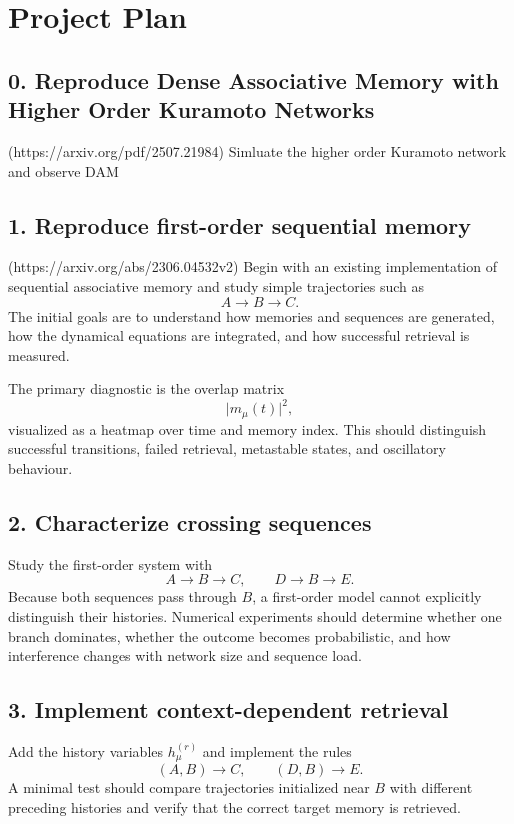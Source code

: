 \documentclass[11pt]{article}
\begin{document}
\section{Project Plan}
\subsection*{0. Reproduce Dense Associative Memory with Higher Order Kuramoto Networks}
(https://arxiv.org/pdf/2507.21984)
Simluate the higher order Kuramoto network and observe DAM


\subsection*{1. Reproduce first-order sequential memory}
(https://arxiv.org/abs/2306.04532v2) 
Begin with an existing implementation of sequential associative memory and study simple trajectories such as
\[
A\to B\to C.
\]
The initial goals are to understand how memories and sequences are generated, how the dynamical equations are integrated, and how successful retrieval is measured.

The primary diagnostic is the overlap matrix
\[
\lvert m_\mu(t)\rvert^2,
\]
visualized as a heatmap over time and memory index. This should distinguish successful transitions, failed retrieval, metastable states, and oscillatory behaviour.

\subsection*{2. Characterize crossing sequences}

Study the first-order system with
\[
A\to B\to C,
\qquad
D\to B\to E.
\]
Because both sequences pass through \(B\), a first-order model cannot explicitly distinguish their histories. Numerical experiments should determine whether one branch dominates, whether the outcome becomes probabilistic, and how interference changes with network size and sequence load.

\subsection*{3. Implement context-dependent retrieval}

Add the history variables \(h_\mu^{(r)}\) and implement the rules
\[
(A,B)\to C,
\qquad
(D,B)\to E.
\]
A minimal test should compare trajectories initialized near \(B\) with different preceding histories and verify that the correct target memory is retrieved.
\end{document}
